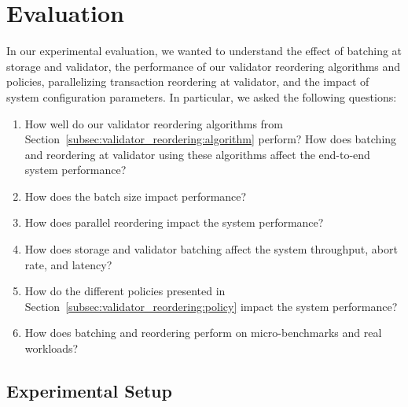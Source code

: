 \section{Evaluation}\label{sec:experiments}
In our experimental evaluation, we wanted to understand the effect of batching at storage and validator, the performance of our validator reordering algorithms and policies, parallelizing transaction reordering at validator, and the impact of system configuration parameters. In particular, we asked the following questions:
\begin{enumerate}
\item\vspace{-.5em} How well do our validator reordering algorithms from Section~\ref{subsec:validator_reordering:algorithm} perform? How does batching and reordering at validator using these algorithms affect the end-to-end system performance?
\item\vspace{-.5em} How does the batch size impact performance? 
\item\vspace{-.5em} How does parallel reordering impact the system performance?
\item\vspace{-.5em} How does storage and validator batching affect the system throughput, abort rate, and latency?
\item\vspace{-.5em} How do the different policies presented in Section~\ref{subsec:validator_reordering:policy} impact the system performance?
\item\vspace{-.5em} How does batching and reordering perform on micro-benchmarks and real workloads?
\end{enumerate}

\subsection{Experimental Setup}
\label{subsec:experiment:implementation}


